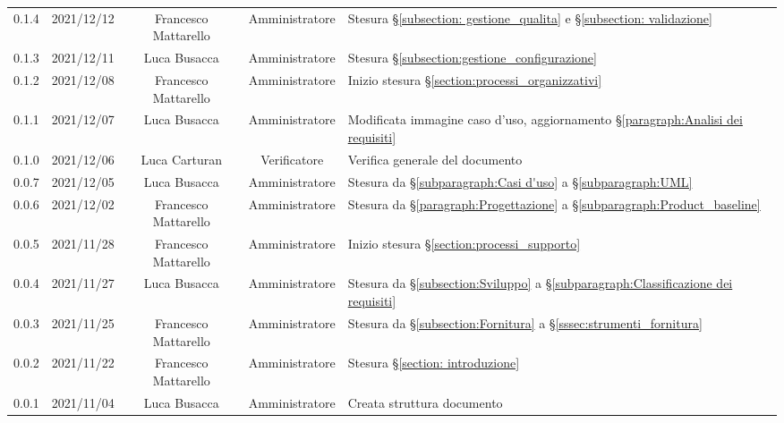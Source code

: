 \begin{center}
\begin{longtable}[c]{c | c | c | c | p{5cm}}
		0.1.4 & 2021/12/12 & Francesco Mattarello & Amministratore & Stesura §\ref{subsection: gestione_qualita} e §\ref{subsection: validazione} \\
		0.1.3 & 2021/12/11 & Luca Busacca         & Amministratore & Stesura  §\ref{subsection:gestione_configurazione} \\
		0.1.2 & 2021/12/08 & Francesco Mattarello & Amministratore & Inizio stesura §\ref{section:processi_organizzativi} \\
		0.1.1 & 2021/12/07 & Luca Busacca         & Amministratore & Modificata immagine caso d'uso, aggiornamento §\ref{paragraph:Analisi dei requisiti} \\
		0.1.0 & 2021/12/06 & Luca Carturan 				& Verificatore   & Verifica generale del documento \\
		0.0.7 & 2021/12/05 & Luca Busacca         & Amministratore & Stesura da  §\ref{subparagraph:Casi d'uso} a §\ref{subparagraph:UML} \\
		0.0.6 & 2021/12/02 & Francesco Mattarello & Amministratore & Stesura da  §\ref{paragraph:Progettazione} a §\ref{subparagraph:Product_baseline} \\
		0.0.5 & 2021/11/28 & Francesco Mattarello & Amministratore & Inizio stesura §\ref{section:processi_supporto}\\
		0.0.4 & 2021/11/27 & Luca Busacca         & Amministratore & Stesura da §\ref{subsection:Sviluppo} a  §\ref{subparagraph:Classificazione dei requisiti} \\
		0.0.3 & 2021/11/25 & Francesco Mattarello & Amministratore & Stesura da §\ref{subsection:Fornitura} a §\ref{sssec:strumenti_fornitura} \\
		0.0.2 & 2021/11/22 & Francesco Mattarello & Amministratore & Stesura §\ref{section: introduzione} \\
		0.0.1 & 2021/11/04 & Luca Busacca         & Amministratore & Creata struttura documento \\
	\end{longtable}
\end{center}
